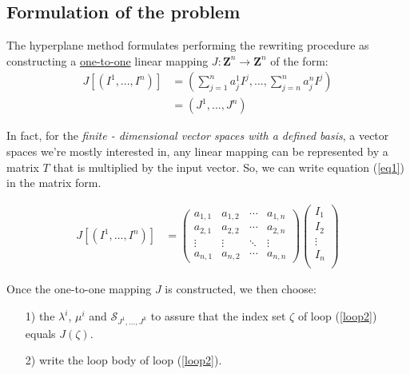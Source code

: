 \subsection {Formulation of the problem}

The hyperplane method formulates performing the rewriting procedure as constructing a
\href {https://en.wikipedia.org/wiki/Injective_function}{one-to-one} linear mapping
$J:\mathbf {Z}^n \rightarrow \mathbf {Z}^n$ of the form:
\begin {equation}
\begin {aligned}
J[(I^1, ..., I^n)] &= \left(\sum^ {n}_ {j = 1}a^1_jI^j, ..., \sum^ {n}_ {j = n}a^n_jI^j \right)\\ &= (J^1, ..., J^n)\label {eq1}
\end {aligned}
\end {equation}

In fact, for the \textit {finite - dimensional vector spaces with a defined basis},
a vector spaces we're mostly interested in, any linear mapping can be represented
by a matrix $T$ that is multiplied by the input vector\cite{EliBendersky}. So, we can
write equation (\ref{eq1}) in the matrix form.

\begin{equation}
\begin{aligned}
  J[(I^1,...,I^n)] &=
  \begin{pmatrix}
    a_{1,1} & a_{1,2} & \cdots & a_{1,n} \\
    a_{2,1} & a_{2,2} & \cdots & a_{2,n} \\
    \vdots  & \vdots  & \ddots & \vdots  \\
    a_{n,1} & a_{n,2} & \cdots & a_{n,n}
  \end{pmatrix}
  \begin{pmatrix}
    I_{1}\\
    I_{2}\\
    \vdots\\
    I_{n}\\
  \end{pmatrix}
\end{aligned}
\end{equation}

Once the one-to-one mapping $J$ is constructed, we then choose:
\begin{itemize}
  \item [1)]
  the $\lambda^i$, $\mu^i$ and $\mathcal{S}_{J^1,...,J^k}$ to assure that the
  index set $\zeta$ of loop (\ref{loop2}) equals $J(\zeta)$.
  \item [2)]
  write the loop body of loop (\ref{loop2}).
\end{itemize}

